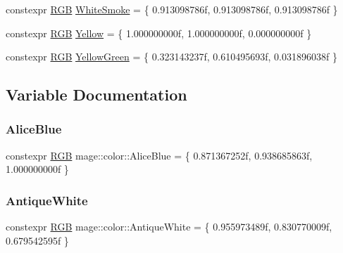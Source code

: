 \begin{DoxyCompactItemize}
\item 
constexpr \hyperlink{structmage_1_1_r_g_b}{R\+GB} \hyperlink{namespacemage_1_1color_ad44d164eafa183126c9287e9a0d1d97d}{White\+Smoke} = \{ 0.\+913098786f, 0.\+913098786f, 0.\+913098786f \}
\item 
constexpr \hyperlink{structmage_1_1_r_g_b}{R\+GB} \hyperlink{namespacemage_1_1color_a4b2488da6699545c05afaf136a5315e5}{Yellow} = \{ 1.\+000000000f, 1.\+000000000f, 0.\+000000000f \}
\item 
constexpr \hyperlink{structmage_1_1_r_g_b}{R\+GB} \hyperlink{namespacemage_1_1color_a72c9b049fd1448d89ff65a5e9cabe044}{Yellow\+Green} = \{ 0.\+323143237f, 0.\+610495693f, 0.\+031896038f \}
\end{DoxyCompactItemize}


\subsection{Variable Documentation}
\hypertarget{namespacemage_1_1color_abd4f16c016b0f4447d08269b0ffb1332}{}\label{namespacemage_1_1color_abd4f16c016b0f4447d08269b0ffb1332} 
\subsubsection{\texorpdfstring{Alice\+Blue}{AliceBlue}}
{\footnotesize\ttfamily constexpr \hyperlink{structmage_1_1_r_g_b}{R\+GB} mage\+::color\+::\+Alice\+Blue = \{ 0.\+871367252f, 0.\+938685863f, 1.\+000000000f \}}

\hypertarget{namespacemage_1_1color_a66ba58abef7d938d58b25b45ebfec98f}{}\label{namespacemage_1_1color_a66ba58abef7d938d58b25b45ebfec98f} 
\subsubsection{\texorpdfstring{Antique\+White}{AntiqueWhite}}
{\footnotesize\ttfamily constexpr \hyperlink{structmage_1_1_r_g_b}{R\+GB} mage\+::color\+::\+Antique\+White = \{ 0.\+955973489f, 0.\+830770009f, 0.\+679542595f \}}

\hypertarget{namespacemage_1_1color_a1c3b68d6209b49526a3ba6d27f4958d9}{}\label{namespacemage_1_1color_a1c3b68d6209b49526a3ba6d27f4958d9} 
